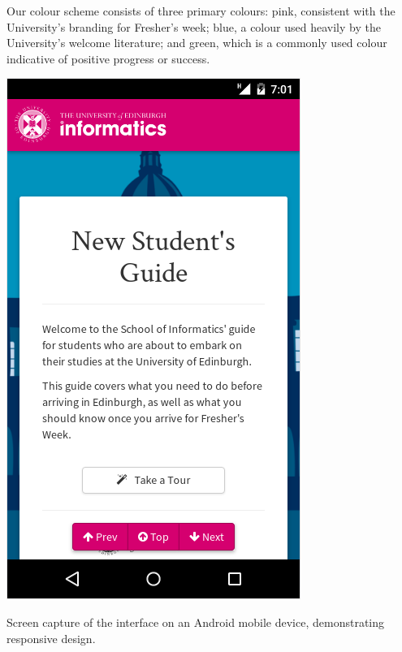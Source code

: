 \documentclass[a4paper, notoc]{tufte-handout}
\begin{document}
Our colour scheme consists of three primary colours: pink, consistent with the University's 
branding for Fresher's week; blue, a colour used heavily by the University's welcome literature; 
and green, which is a commonly used colour indicative of positive progress or success.


\begin{marginfigure}
  \includegraphics[width=\linewidth]{interface-mobile.png}
  \caption{
    \label{fig:interfacemob}
    Screen capture of the interface on an Android mobile device, demonstrating responsive
    design.
  }
\end{marginfigure}
\end{document}
